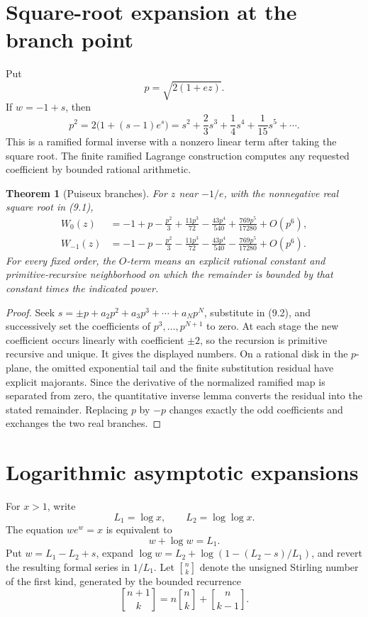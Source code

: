 \documentclass[11pt]{article}
\newtheorem{theorem}{Theorem}[section]
\theoremstyle{definition}
\begin{document}
\section{Square-root expansion at the branch point}\label{sec:puiseux}

Put
\[
 p=\sqrt{2(1+ez)}.
 \tag{9.1}
\]
If \(w=-1+s\), then
\[
 p^2=2\bigl(1+(s-1)e^s\bigr)
 =s^2+\frac23s^3+\frac14s^4+\frac1{15}s^5+\cdots.
 \tag{9.2}
\]
This is a ramified formal inverse with a nonzero linear term after taking the
square root.  The finite ramified Lagrange construction computes any requested
coefficient by bounded rational arithmetic.

\begin{theorem}[Puiseux branches]\label{thm:puiseux}
For \(z\) near \(-1/e\), with the nonnegative real square root in (9.1),
\begin{align}
 W_0(z)&=-1+p-\frac{p^2}{3}+\frac{11p^3}{72}
       -\frac{43p^4}{540}+\frac{769p^5}{17280}+O(p^6),
 \tag{9.3}\\
 W_{-1}(z)&=-1-p-\frac{p^2}{3}-\frac{11p^3}{72}
       -\frac{43p^4}{540}-\frac{769p^5}{17280}+O(p^6).
 \tag{9.4}
\end{align}
For every fixed order, the \(O\)-term means an explicit rational constant and
primitive-recursive neighborhood on which the remainder is bounded by that
constant times the indicated power.
\end{theorem}

\begin{proof}
Seek \(s=\pm p+a_2p^2+a_3p^3+\cdots+a_Np^N\), substitute in (9.2), and
successively set the coefficients of \(p^3,\ldots,p^{N+1}\) to zero.  At each
stage the new coefficient occurs linearly with coefficient \(\pm2\), so the
recursion is primitive recursive and unique.  It gives the displayed numbers.
On a rational disk in the \(p\)-plane, the omitted exponential tail and the
finite substitution residual have explicit majorants.  Since the derivative
of the normalized ramified map is separated from zero, the quantitative
inverse lemma converts the residual into the stated remainder.  Replacing
\(p\) by \(-p\) changes exactly the odd coefficients and exchanges the two
real branches.
\end{proof}

\section{Logarithmic asymptotic expansions}\label{sec:asymptotic}

For \(x>1\), write
\[
 L_1=\log x,\qquad L_2=\log\log x.
\]
The equation \(we^w=x\) is equivalent to
\[
 w+\log w=L_1.
 \tag{10.1}
\]
Put \(w=L_1-L_2+s\), expand
\(\log w=L_2+\log(1-(L_2-s)/L_1)\), and revert the resulting formal series in
\(1/L_1\).  Let \(\genfrac{[}{]}{0pt}{}{n}{k}\) denote the unsigned Stirling
number of the first kind, generated by the bounded recurrence
\[
 \genfrac{[}{]}{0pt}{}{n+1}{k}
 =n\genfrac{[}{]}{0pt}{}{n}{k}+\genfrac{[}{]}{0pt}{}{n}{k-1}.
\]
\end{document}

